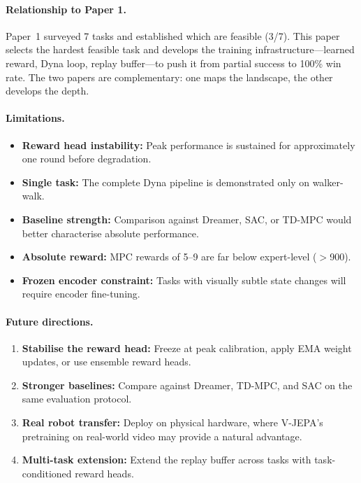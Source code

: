 \documentclass{article}
\begin{document}
\paragraph{Relationship to Paper 1.}
Paper~1 surveyed 7 tasks and established which are feasible (3/7). This paper selects the hardest feasible task and develops the training infrastructure---learned reward, Dyna loop, replay buffer---to push it from partial success to 100\% win rate. The two papers are complementary: one maps the landscape, the other develops the depth.

\paragraph{Limitations.}
\begin{itemize}
    \item \textbf{Reward head instability:} Peak performance is sustained for approximately one round before degradation.
    \item \textbf{Single task:} The complete Dyna pipeline is demonstrated only on walker-walk.
    \item \textbf{Baseline strength:} Comparison against Dreamer, SAC, or TD-MPC would better characterise absolute performance.
    \item \textbf{Absolute reward:} MPC rewards of 5--9 are far below expert-level ($>$900).
    \item \textbf{Frozen encoder constraint:} Tasks with visually subtle state changes will require encoder fine-tuning.
\end{itemize}

\paragraph{Future directions.}
\begin{enumerate}
    \item \textbf{Stabilise the reward head:} Freeze at peak calibration, apply EMA weight updates, or use ensemble reward heads.
    \item \textbf{Stronger baselines:} Compare against Dreamer, TD-MPC, and SAC on the same evaluation protocol.
    \item \textbf{Real robot transfer:} Deploy on physical hardware, where V-JEPA's pretraining on real-world video may provide a natural advantage.
    \item \textbf{Multi-task extension:} Extend the replay buffer across tasks with task-conditioned reward heads.
\end{enumerate}
\end{document}
